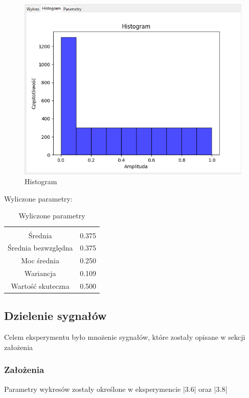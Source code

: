 \documentclass{article}
\begin{document}
\begin{figure}[h!]
    \centering
    \includegraphics[width=\textwidth]{img/mul/hist.png}
    \caption{Histogram}
\end{figure}
\FloatBarrier
Wyliczone parametry:
\begin{table}[h!]
    \centering
    \vspace{0.2cm}
    \begin{tabular}{|c|c|}
        \hline\hline\\[-0.4cm]
        Średnia & 0.375 \\
        \hline
        Średnia bezwzględna & 0.375  \\
        \hline
        Moc średnia & 0.250  \\
        \hline
        Wariancja & 0.109 \\
        \hline
        Wartość skuteczna & 0.500 \\
        \hline
    \end{tabular}
    \caption{Wyliczone parametry}
    \label{mul}
\end{table}   

\subsection{Dzielenie sygnałów} \label{div} 

Celem eksperymentu było mnożenie sygnałów, które zostały opisane w sekcji założenia

\subsubsection{Założenia} 
    Parametry wykresów zostały określone w eksperymencie |3.6| oraz |3.8|
\end{document}
